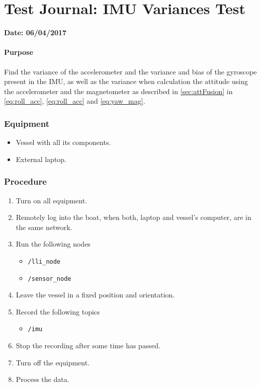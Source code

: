 \chapter{Test Journal: IMU Variances Test} \label{app:IMUVariances}

\textbf{Date: 06/04/2017}

\subsubsection*{Purpose}
Find the variance of the accelerometer and the variance and bias of the gyroscope present in the IMU, as well as the variance when calculation the attitude using the accelerometer and the magnetometer as described in \autoref{sec:attFusion} in \autoref{eq:roll_acc}, \ref{eq:roll_acc} and \ref{eq:yaw_mag}.

\subsection*{Equipment}
\begin{itemize}
    \item Vessel with all its components.
    \item External laptop.
\end{itemize}

\subsection*{Procedure}
\begin{enumerate}
    \item Turn on all equipment.
    \item Remotely log into the boat, when both, laptop and vessel's computer, are in the same network.
    \item Run the following nodes
    \begin{itemize}
        \item \lstinline[style=cinline]{/lli_node}
        \item \lstinline[style=cinline]{/sensor_node}
    \end{itemize}
    \item Leave the vessel in a fixed position and orientation.
    \item Record the following topics
    \begin{itemize}
        \item \lstinline[style=cinline]{/imu}      
    \end{itemize}
    \item Stop the recording after some time has passed.
    \item Turn off the equipment.
    \item Process the data.
\end{enumerate}

